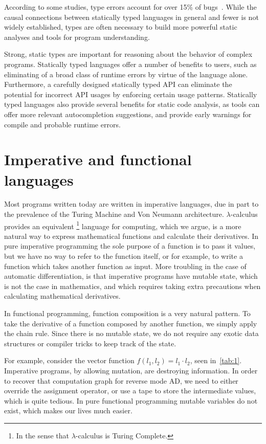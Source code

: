 \documentclass[12pt,initial,twoside,maitrise]{dms}
\numberwithin{equation}{section}
\numberwithin{table}{chapter}
\numberwithin{figure}{chapter}
\begin{document}
According to some studies, type errors account for over 15\% of bugs~\cite{gao2017type}. While the causal connections between statically typed languages in general and fewer is not widely established, types are often necessary to build more powerful static analyses and tools for program understanding.

Strong, static types are important for reasoning about the behavior of complex programs. Statically typed languages offer a number of benefits to users, such as eliminating of a broad class of runtime errors by virtue of the language alone. Furthermore, a carefully designed statically typed API can eliminate the potential for incorrect API usages by enforcing certain usage patterns. Statically typed languages also provide several benefits for static code analysis, as tools can offer more relevant autocompletion suggestions, and provide early warnings for compile and probable runtime errors.

\section{Imperative and functional languages}

Most programs written today are written in imperative languages, due in part to the prevalence of the Turing Machine and Von Neumann architecture. $\lambda$-calculus provides an equivalent \footnote{In the sense that $\lambda$-calculus is Turing Complete.} language for computing, which we argue, is a more natural way to express mathematical functions and calculate their derivatives. In pure imperative programming the sole purpose of a function is to pass it values, but we have no way to refer to the function itself, or for example, to write a function which takes another function as input. More troubling in the case of automatic differentiation, is that imperative programs have mutable state, which is not the case in mathematics, and which requires taking extra precautions when calculating mathematical derivatives.

In functional programming, function composition is a very natural pattern. To take the derivative of a function composed by another function, we simply apply the chain rule. Since there is no mutable state, we do not require any exotic data structures or compiler tricks to keep track of the state.

For example, consider the vector function $f(l_1, l_2) = l_1 \cdot l_2$, seen in~\ref{tab:1}. Imperative programs, by allowing mutation, are destroying information. In order to recover that computation graph for reverse mode AD, we need to either override the assignment operator, or use a tape to store the intermediate values, which is quite tedious. In pure functional programming mutable variables do not exist, which makes our lives much easier.
\end{document}
